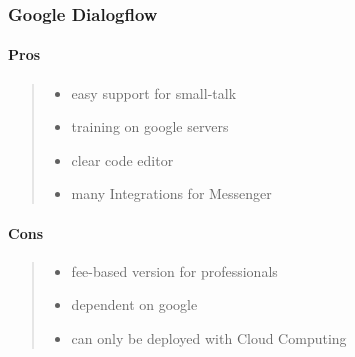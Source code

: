 \documentclass[10pt,final,journal,a4paper,oneside,twocolumn]{IEEEtran}
\begin{document}
\subsubsection{Google Dialogflow}
\paragraph{Pros}
\begin{quote}
\begin{itemize}
\item easy support for small-talk
\item training on google servers
\item clear code editor 
\item many Integrations for Messenger
\end{itemize}
\end{quote}
\paragraph{Cons}
\begin{quote}
\begin{itemize}
\item fee-based version for professionals
\item dependent on google
\item can only be deployed with Cloud Computing
\end{itemize}
\end{quote}
\end{document}
